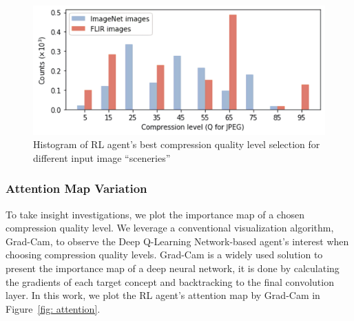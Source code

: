 \begin{figure}[htb]
    \includegraphics[width=\linewidth]{figures/dataset_change.pdf}
    \caption{Histogram of RL agent's best compression quality level selection for different input image ``sceneries''}
    \label{fig: dataset_change}
\end{figure}

\subsubsection{\textbf{Attention Map Variation}}
\label{subsec: attention map}

To take insight investigations, we plot the importance map of a chosen compression quality level. We leverage a conventional visualization algorithm, Grad-Cam, to observe the Deep Q-Learning Network-based agent's interest when choosing compression quality levels. Grad-Cam is a widely used solution to present the importance map of a deep neural network, it is done by calculating the gradients of each target concept and backtracking to the final convolution layer. In this work, we plot the RL agent's attention map by Grad-Cam in Figure~\ref{fig: attention}. %

